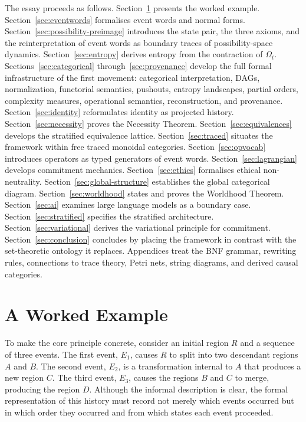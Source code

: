\documentclass[12pt]{article}
\theoremstyle{plain}
\theoremstyle{definition}
\theoremstyle{remark}
\begin{document}
The essay proceeds as follows.  Section~\ref{sec:worked} presents the worked
example.  Section~\ref{sec:eventwords} formalises event words and normal forms.
Section~\ref{sec:possibility-preimage} introduces the state pair, the three
axioms, and the reinterpretation of event words as boundary traces of
possibility-space dynamics.  Section~\ref{sec:entropy} derives entropy from
the contraction of $\Omega_t$.  Sections~\ref{sec:categorical}
through~\ref{sec:provenance} develop the full formal infrastructure of the first
movement: categorical interpretation, DAGs, normalization, functorial semantics,
pushouts, entropy landscapes, partial orders, complexity measures, operational
semantics, reconstruction, and provenance.  Section~\ref{sec:identity} reformulates
identity as projected history.  Section~\ref{sec:necessity} proves the Necessity
Theorem.  Section~\ref{sec:equivalences} develops the stratified equivalence
lattice.  Section~\ref{sec:traced} situates the framework within free traced
monoidal categories.  Section~\ref{sec:opvocab} introduces operators as typed
generators of event words.  Section~\ref{sec:lagrangian} develops commitment
mechanics.  Section~\ref{sec:ethics} formalises ethical non-neutrality.
Section~\ref{sec:global-structure} establishes the global categorical diagram.
Section~\ref{sec:worldhood} states and proves the Worldhood Theorem.
Section~\ref{sec:ai} examines large language models as a boundary case.
Section~\ref{sec:stratified} specifies the stratified architecture.
Section~\ref{sec:variational} derives the variational principle for commitment.
Section~\ref{sec:conclusion} concludes by placing the framework in contrast
with the set-theoretic ontology it replaces.  Appendices treat the BNF grammar,
rewriting rules, connections to trace theory, Petri nets, string diagrams, and
derived causal categories.
\section{A Worked Example}
\label{sec:worked}

To make the core principle concrete, consider an initial region $R$ and a
sequence of three events.  The first event, $E_1$, causes $R$ to split into
two descendant regions $A$ and $B$.  The second event, $E_2$, is a
transformation internal to $A$ that produces a new region $C$.  The third
event, $E_3$, causes the regions $B$ and $C$ to merge, producing the region
$D$.  Although the informal description is clear, the formal representation
of this history must record not merely which events occurred but in which
order they occurred and from which states each event proceeded.
\end{document}
